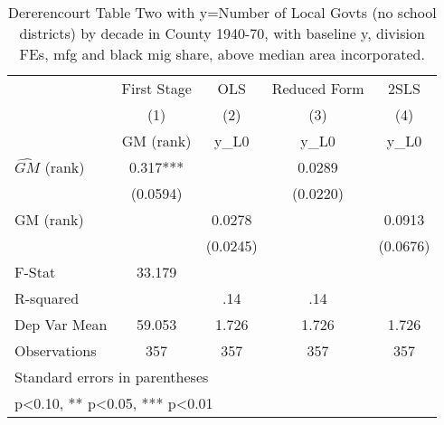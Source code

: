 \begin{table}[htbp]\centering
\def\sym#1{\ifmmode^{#1}\else\(^{#1}\)\fi}
\caption{Dererencourt Table Two with y=Number of Local Govts (no school districts) by decade in County 1940-70, with baseline y, division FEs, mfg and black mig share, above median area incorporated.}
\begin{tabular}{l*{4}{c}}
\toprule
                    & First Stage   &         OLS   &Reduced Form   &        2SLS   \\
                    &\multicolumn{1}{c}{(1)}&\multicolumn{1}{c}{(2)}&\multicolumn{1}{c}{(3)}&\multicolumn{1}{c}{(4)}\\
                    &\multicolumn{1}{c}{GM  (rank)}&\multicolumn{1}{c}{y\_L0}&\multicolumn{1}{c}{y\_L0}&\multicolumn{1}{c}{y\_L0}\\
\midrule
$\hat{GM}$ (rank)   &       0.317***&               &      0.0289   &               \\
                    &    (0.0594)   &               &    (0.0220)   &               \\
\addlinespace
GM  (rank)          &               &      0.0278   &               &      0.0913   \\
                    &               &    (0.0245)   &               &    (0.0676)   \\
\midrule
F-Stat              &      33.179   &               &               &               \\
R-squared           &               &         .14   &         .14   &               \\
Dep Var Mean        &      59.053   &       1.726   &       1.726   &       1.726   \\
Observations        &         357   &         357   &         357   &         357   \\
\bottomrule
\multicolumn{5}{l}{\footnotesize Standard errors in parentheses}\\
\multicolumn{5}{l}{\footnotesize * p<0.10, ** p<0.05, *** p<0.01}\\
\end{tabular}
\end{table}
